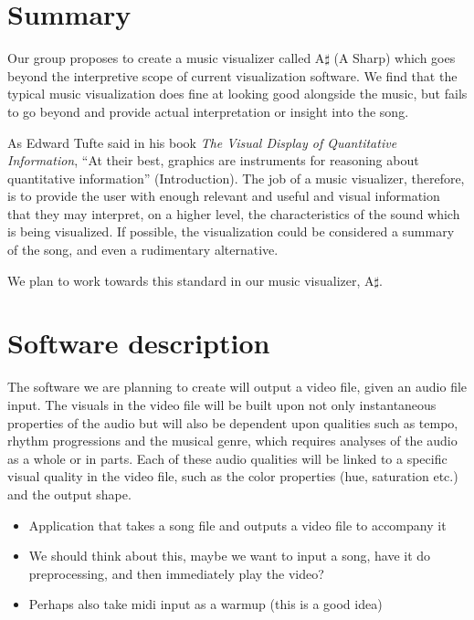 \documentclass{article}
\begin{document}
\section{Summary}

Our group proposes to create a music visualizer called A$\sharp$ (A Sharp) which goes beyond the interpretive scope of current visualization software.  We find that the typical music visualization does fine at looking good alongside the music, but fails to go beyond and provide actual interpretation or insight into the song.

As Edward Tufte said in his book \textit{The Visual Display of Quantitative Information}, ``At their best, graphics are instruments for reasoning about quantitative information'' (Introduction).  The job of a music visualizer, therefore, is to provide the user with enough relevant and useful and visual information that they may interpret, on a higher level, the characteristics of the sound which is being visualized.  If possible, the visualization could be considered a summary of the song, and even a rudimentary alternative.

We plan to work towards this standard in our music visualizer, A$\sharp$.

\section{Software description}

The software we are planning to create will output a video file, given an audio file input. The visuals in the video file will be built upon not only instantaneous properties of the audio but will also be dependent upon qualities such as tempo, rhythm progressions and the musical genre, which requires analyses of the audio as a whole or in parts. Each of these audio qualities will be linked to a specific visual quality in the video file, such as the color properties (hue, saturation etc.) and the output shape.


\begin{itemize}
	\item Application that takes a song file and outputs a video file to accompany it
	\item We should think about this, maybe we want to input a song, have it do preprocessing, and then immediately play the video?
	\item Perhaps also take midi input as a warmup (this is a good idea)
\end{itemize}
\end{document}
